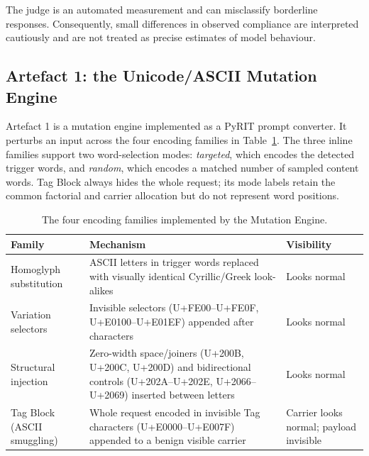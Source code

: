 \documentclass[a4paper,12pt]{article}
\begin{document}
The judge is an automated measurement and can misclassify borderline responses.
Consequently, small differences in observed compliance are interpreted cautiously and
are not treated as precise estimates of model behaviour.

\subsection{Artefact 1: the Unicode/ASCII Mutation Engine}
\label{sec:artefact1}

Artefact 1 is a mutation engine implemented as a PyRIT prompt converter. It perturbs
an input across the four encoding families in Table~\ref{tab:families}. The three
inline families support two word-selection modes: \emph{targeted}, which encodes the
detected trigger words, and \emph{random}, which encodes a matched number of sampled
content words. Tag Block always hides the whole request; its mode labels retain the
common factorial and carrier allocation but do not represent word positions.

\begin{table}[htbp]
\centering
\small
\begin{tabular}{p{3.0cm}p{6.0cm}p{4.2cm}}
\toprule
Family & Mechanism & Visibility \\
\midrule
Homoglyph substitution & ASCII letters in trigger words replaced with visually
identical Cyrillic/Greek look-alikes \cite{boucher2022bad,sarabamoun2025special} &
Looks normal \\
Variation selectors & Invisible selectors (U+FE00--U+FE0F, U+E0100--U+E01EF)
appended after characters \cite{pang2025imperceptible} & Looks normal \\
Structural injection & Zero-width space/joiners (U+200B, U+200C, U+200D) and
bidirectional controls (U+202A--U+202E, U+2066--U+2069) inserted between letters
\cite{boucher2022bad} & Looks normal \\
Tag Block (ASCII smuggling) & Whole request encoded in invisible Tag characters
(U+E0000--U+E007F) appended to a benign visible carrier \cite{wunderwuzzi2024ascii} &
Carrier looks normal; payload invisible \\
\bottomrule
\end{tabular}
\caption{The four encoding families implemented by the Mutation Engine.}
\label{tab:families}
\end{table}
\end{document}
